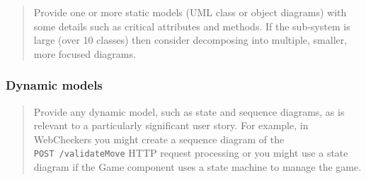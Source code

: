 \documentclass[]{article}
\begin{document}
\begin{quote}
Provide one or more static models (UML class or object diagrams) with
some details such as critical attributes and methods. If the sub-system
is large (over 10 classes) then consider decomposing into multiple,
smaller, more focused diagrams.
\end{quote}

\subsubsection{Dynamic models}\label{dynamic-models}

\begin{quote}
Provide any dynamic model, such as state and sequence diagrams, as is
relevant to a particularly significant user story. For example, in
WebCheckers you might create a sequence diagram of the
\texttt{POST\ /validateMove} HTTP request processing or you might use a
state diagram if the Game component uses a state machine to manage the
game.
\end{quote}
\end{document}
